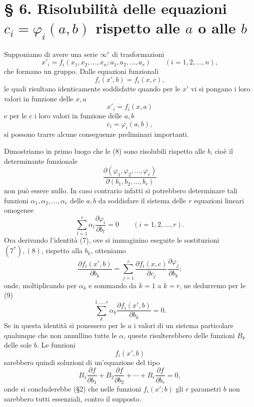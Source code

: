 \documentclass[11pt]{book}
\begin{document}
\section*{\S{} 6. Risolubilità delle equazioni $c_i=\varphi_i(a,b)$ rispetto alle $a$ o alle $b$}

Supponiamo di avere una serie $\infty^r$ di trasformazioni
\begin{equation*}\tag{6}
 x'_i=f_i(x_1,x_2,\ldots,x_n;a_1,a_2,\ldots,a_r)\qquad (i=1,2,\ldots,n),
\end{equation*}
che formano un gruppo. Dalle equazioni funzionali
\begin{equation*}\tag{7}
 f_i(x',b)=f_i(x,c),
\end{equation*}
le quali risultano identicamente soddisfatte quando per le $x'$ vi si pongano i loro valori in funzione delle $x,a$
\begin{equation*}\tag{$7^*$}
 x'_i=f_i(x,a)
\end{equation*}
e per le $c$ i loro valori in funzione delle $a,b$
\begin{equation*}\tag{8}
 c_i=\varphi_i(a,b),
\end{equation*}
si possono trarre alcune conseguenze preliminari importanti.

Dimostriamo in primo luogo che le (8) sono risolubili rispetto alle $b$, cioè il determinante funzionale
\[
 \frac{\partial(\varphi_1,\varphi_2,\ldots,\varphi_r)}{\partial(b_1,b_2,\ldots,b_r)}
\]
non può essere nullo. In caso contrario infatti si potrebbero determinare tali funzioni $\alpha_1,\alpha_2,\ldots,\alpha_r$ delle $a,b$ da soddisfare il sistema delle $r$ equazioni lineari omogenee
\begin{equation*}\tag{9}
 \sum\limits_{l=1}^r \alpha_l\frac{\partial \varphi_i}{\partial b_l}=0\qquad (i=1,2,\ldots,r).
\end{equation*}
Ora derivando l'identità (7), ove si immaginino eseguite le sostituzioni $(7^*),(8)$, rispetto alla $b_k$, otteniamo
\[
 \frac{\partial f_i(x',b)}{\partial b_k}
 =\sum\limits_{j=1}^r\frac{\partial f_i(x,c)}{\partial c_j}\frac{\partial\varphi_j}{\partial b_k};
\]
onde, moltiplicando per $\alpha_k$ e sommando da $k=1$ a $k=r$, ne dedurremo per le (9)
\[
 \sum\limits_k^{1,\ldots,r} \alpha_k\frac{\partial f_i(x',b)}{\partial b_k}=0.
\]
Se in questa identità si ponessero per le $a$ i valori di un sistema particolare qualunque che non annullino tutte le $\alpha$, queste risulterebbero delle funzioni $B_k$ delle sole $b$. Le funzioni
\[
 f_i(x',b)
\]
sarebbero quindi soluzioni di un'equazione del tipo
\[
 B_1\frac{\partial f}{\partial b_1}+B_2\frac{\partial f}{\partial b_2}+\cdots+B_r\frac{\partial f}{\partial b_r}=0,
\]
onde si concluderebbe (\S{}2) che nelle funzioni $f_i(x';b)$ gli $r$ parametri $b$ non sarebbero tutti essenziali, contro il supposto.
\end{document}
